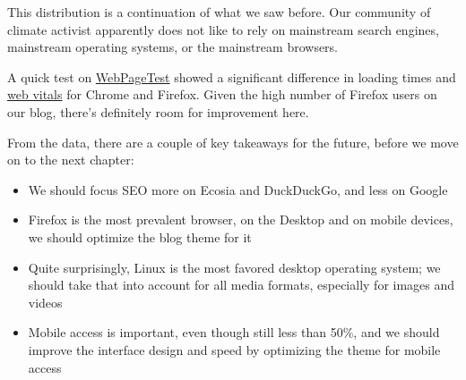 This distribution is a continuation of what we saw before. Our community of climate activist apparently does not like to rely on mainstream search engines, mainstream operating systems, or the mainstream browsers.

A quick test on \href{https://webpagetest.org/}{WebPageTest} showed a significant difference in loading times and \href{https://web.dev/vitals/}{web vitals} for Chrome and Firefox. Given the high number of Firefox users on our blog, there's definitely room for improvement here.

From the data, there are a couple of key takeaways for the future, before we move on to the next chapter:

\begin{itemize}
 \item We should focus SEO more on Ecosia and DuckDuckGo, and less on Google
 \item Firefox is the most prevalent browser, on the Desktop and on mobile devices, we should optimize the blog theme for it
 \item Quite surprisingly, Linux is the most favored desktop operating system; we should take that into account for all media formats, especially for images and videos
 \item Mobile access is important, even though still less than 50\%, and we should improve the interface design and speed by optimizing the theme for mobile access
\end{itemize}
